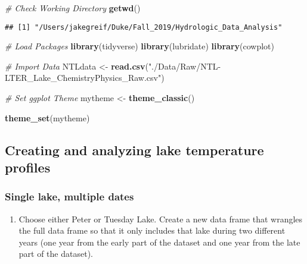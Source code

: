 \documentclass[]{article}
\newenvironment{Shaded}{\begin{snugshade}}{\end{snugshade}}
\newcommand{\CommentTok}[1]{\textcolor[rgb]{0.56,0.35,0.01}{\textit{#1}}}
\newcommand{\KeywordTok}[1]{\textcolor[rgb]{0.13,0.29,0.53}{\textbf{#1}}}
\newcommand{\NormalTok}[1]{#1}
\newcommand{\StringTok}[1]{\textcolor[rgb]{0.31,0.60,0.02}{#1}}
\providecommand{\tightlist}{%
  \setlength{\itemsep}{0pt}\setlength{\parskip}{0pt}}
\begin{document}
\begin{Shaded}
\begin{Highlighting}[]
\CommentTok{# Check Working Directory}
\KeywordTok{getwd}\NormalTok{()}
\end{Highlighting}
\end{Shaded}

\begin{verbatim}
## [1] "/Users/jakegreif/Duke/Fall_2019/Hydrologic_Data_Analysis"
\end{verbatim}

\begin{Shaded}
\begin{Highlighting}[]
\CommentTok{# Load Packages}
\KeywordTok{library}\NormalTok{(tidyverse)}
\KeywordTok{library}\NormalTok{(lubridate)}
\KeywordTok{library}\NormalTok{(cowplot)}

\CommentTok{# Import Data}
\NormalTok{NTLdata <-}\StringTok{ }\KeywordTok{read.csv}\NormalTok{(}\StringTok{"./Data/Raw/NTL-LTER_Lake_ChemistryPhysics_Raw.csv"}\NormalTok{)}

\CommentTok{# Set ggplot Theme}
\NormalTok{mytheme <-}\StringTok{ }\KeywordTok{theme_classic}\NormalTok{()}

\KeywordTok{theme_set}\NormalTok{(mytheme)}
\end{Highlighting}
\end{Shaded}

\hypertarget{creating-and-analyzing-lake-temperature-profiles}{%
\subsection{Creating and analyzing lake temperature
profiles}\label{creating-and-analyzing-lake-temperature-profiles}}

\hypertarget{single-lake-multiple-dates}{%
\subsubsection{Single lake, multiple
dates}\label{single-lake-multiple-dates}}

\begin{enumerate}
\def\labelenumi{\arabic{enumi}.}
\setcounter{enumi}{4}
\tightlist
\item
  Choose either Peter or Tuesday Lake. Create a new data frame that
  wrangles the full data frame so that it only includes that lake during
  two different years (one year from the early part of the dataset and
  one year from the late part of the dataset).
\end{enumerate}
\end{document}
